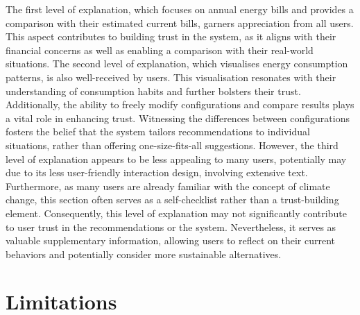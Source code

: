 The first level of explanation, which focuses on annual energy bills and provides a comparison with their estimated current bills, garners appreciation from all users. 
This aspect contributes to building trust in the system, as it aligns with their financial concerns as well as enabling a comparison with their real-world situations.
The second level of explanation, which visualises energy consumption patterns, is also well-received by users. 
This visualisation resonates with their understanding of consumption habits and further bolsters their trust.
Additionally, the ability to freely modify configurations and compare results plays a vital role in enhancing trust. 
Witnessing the differences between configurations fosters the belief that the system tailors recommendations to individual situations, rather than offering one-size-fits-all suggestions.
However, the third level of explanation appears to be less appealing to many users, potentially may due to its less user-friendly interaction design, involving extensive text. 
Furthermore, as many users are already familiar with the concept of climate change, this section often serves as a self-checklist rather than a trust-building element.
Consequently, this level of explanation may not significantly contribute to user trust in the recommendations or the system. 
Nevertheless, it serves as valuable supplementary information, allowing users to reflect on their current behaviors and potentially consider more sustainable alternatives.


\section{Limitations}

